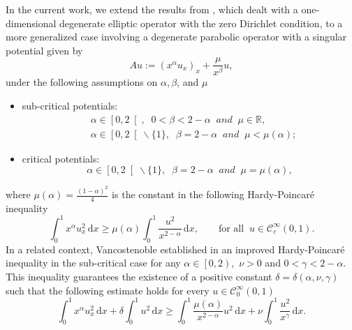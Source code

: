 \documentclass[sn-mathphys]{sn-jnl}
\begin{document}
In the current work, we extend the results from \citep{BP'18}, which dealt with a one-dimensional degenerate elliptic operator with the zero Dirichlet condition, to a more generalized case involving a degenerate parabolic operator with a singular potential given by
    \begin{equation*}
        A u := (x^{\alpha} u_x)_x + \dfrac{\mu}{x^{\beta}} u,
    \end{equation*}
under the following assumptions on $\alpha, \beta$, and $\mu$  
    \begin{itemize}
		\item  sub-critical potentials:
		\begin{equation}\label{assump1}
			\begin{aligned}
				&\alpha \in \left[ 0 , 2 \right[ , \; \; 0< \beta< 2- \alpha \; \; \mathit{and} \;  \; \mu \in \mathbb{R},\\
				&\alpha \in \left[ 0 , 2 \right[ \backslash\lbrace{1}\rbrace, \; \; \beta= 2- \alpha \; \; \mathit{and} 		\; \; \mu < \mu( \alpha);
			\end{aligned}
		\end{equation}
		\item critical potentials:
		\begin{equation}
			\alpha \in \left[ 0 , 2 \right[ \backslash\lbrace{1}\rbrace, \; \; \beta= 2- \alpha \; \; \mathit{and} 		\; \; \mu = \mu( \alpha), \label{assump2}
		\end{equation}
	\end{itemize}
	where $\mu(\alpha)= \displaystyle{\frac{(1-\alpha)^{2}}{4}}$ is the constant in the following Hardy-Poincar\'e inequality
	\begin{equation}\label{hardy1}
		\displaystyle{\int_{0}^{1}} x^{\alpha} u_{x}^{2} \,\mathrm{d}x \geq \mu(\alpha) \displaystyle{\int_{0}^{1}} \displaystyle{\frac{u^{2}}{x^{2-\alpha}}} \,\mathrm{d}x, \qquad \text{for all}\;\; u \in \mathcal{C}^{\infty}_{c}\left( 0 , 1 \right).  
	\end{equation}
In a related context, Vancostenoble established in \citep{V} an improved Hardy-Poincar\'e inequality in the sub-critical case for any $\alpha \in \left[0,2\right),$ $\nu>0$ and $0<\gamma<2-\alpha$. This inequality guarantees the existence of a positive constant $\delta= \delta(\alpha, \nu,\gamma)$ such that the following estimate holds for every $u \in \mathcal{C}_0^{\infty}(0,1)$
    \begin{equation}\label{hardy2}
        \int_0^1 x^{\alpha} u_x^2 \,\mathrm{d}x + \delta \int_0^1 u^2 \,\mathrm{d}x \geq \int_0^1 \dfrac{\mu(\alpha)}{x^{2-\alpha}} u^2 \,\mathrm{d}x + \nu \int_0^1 \dfrac{u^2}{x^{\gamma}} \,\mathrm{d}x.
    \end{equation}
    
\end{document}
